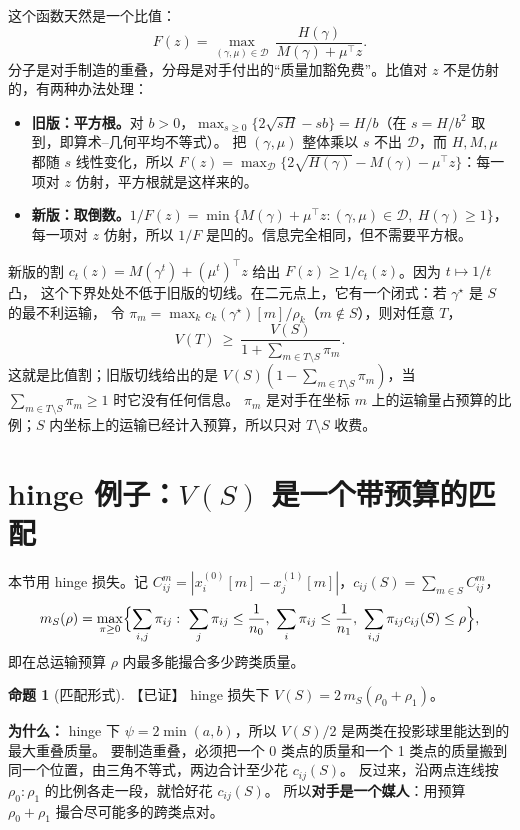 \documentclass[11pt,a4paper,fontset=none]{ctexart}
\theoremstyle{definition}
\newtheorem{proposition}{命题}
\newenvironment{why}{\par\noindent\textbf{为什么：}\ignorespaces}{\par}
\newcommand{\status}[1]{\textrm{【#1】}}
\begin{document}
这个函数天然是一个比值：
\[
F(z)=\max_{(\gamma,\mu)\in\mathcal D}\ \frac{H(\gamma)}{M(\gamma)+\mu^\top z}.
\]
分子是对手制造的重叠，分母是对手付出的“质量加豁免费”。比值对 $z$ 不是仿射的，有两种办法处理：
\begin{itemize}
\item \textbf{旧版：平方根。}对 $b>0$，$\max_{s\ge0}\{2\sqrt{sH}-sb\}=H/b$（在 $s=H/b^2$ 取到，即算术--几何平均不等式）。
把 $(\gamma,\mu)$ 整体乘以 $s$ 不出 $\mathcal D$，而 $H,M,\mu$ 都随 $s$ 线性变化，所以
$F(z)=\max_{\mathcal D}\{2\sqrt{H(\gamma)}-M(\gamma)-\mu^\top z\}$：每一项对 $z$ 仿射，平方根就是这样来的。
\item \textbf{新版：取倒数。}$1/F(z)=\min\{M(\gamma)+\mu^\top z:(\gamma,\mu)\in\mathcal D,\ H(\gamma)\ge1\}$，
每一项对 $z$ 仿射，所以 $1/F$ 是凹的。信息完全相同，但不需要平方根。
\end{itemize}
新版的割 $c_t(z)=M(\gamma^t)+(\mu^t)^\top z$ 给出 $F(z)\ge1/c_t(z)$。因为 $t\mapsto1/t$ 凸，
这个下界处处不低于旧版的切线。在二元点上，它有一个闭式：若 $\gamma^\star$ 是 $S$ 的最不利运输，
令 $\pi_m=\max_kc_k(\gamma^\star)[m]/\rho_k$（$m\notin S$），则对任意 $T$，
\begin{equation}\label{eq:ratio}
V(T)\ \ge\ \frac{V(S)}{1+\sum_{m\in T\setminus S}\pi_m}.
\end{equation}
这就是比值割；旧版切线给出的是 $V(S)(1-\sum_{m\in T\setminus S}\pi_m)$，当 $\sum_{m\in T\setminus S}\pi_m\ge1$ 时它没有任何信息。
$\pi_m$ 是对手在坐标 $m$ 上的运输量占预算的比例；$S$ 内坐标上的运输已经计入预算，所以只对 $T\setminus S$ 收费。

\section{hinge 例子：\texorpdfstring{$V(S)$}{V(S)} 是一个带预算的匹配}\label{sec:hinge}
本节用 hinge 损失。记 $C^m_{ij}=|x_i^{(0)}[m]-x_j^{(1)}[m]|$，$c_{ij}(S)=\sum_{m\in S}C^m_{ij}$，
\begin{equation}\label{eq:matching}
m_S(\rho)=\max_{\pi\ge0}\Bigl\{\sum_{i,j}\pi_{ij}:\
\sum_j\pi_{ij}\le\frac1{n_0},\ \sum_i\pi_{ij}\le\frac1{n_1},\
\sum_{i,j}\pi_{ij}c_{ij}(S)\le\rho\Bigr\},
\end{equation}
即在总运输预算 $\rho$ 内最多能撮合多少跨类质量。

\begin{proposition}[匹配形式]\label{prop:matching}\status{已证}
hinge 损失下 $V(S)=2\,m_S(\rho_0+\rho_1)$。
\end{proposition}
\begin{why}
hinge 下 $\psi=2\min(a,b)$，所以 $V(S)/2$ 是两类在投影球里能达到的最大重叠质量。
要制造重叠，必须把一个 0 类点的质量和一个 1 类点的质量搬到同一个位置，由三角不等式，两边合计至少花 $c_{ij}(S)$。
反过来，沿两点连线按 $\rho_0:\rho_1$ 的比例各走一段，就恰好花 $c_{ij}(S)$。
所以\textbf{对手是一个媒人}：用预算 $\rho_0+\rho_1$ 撮合尽可能多的跨类点对。
\end{why}
\end{document}
